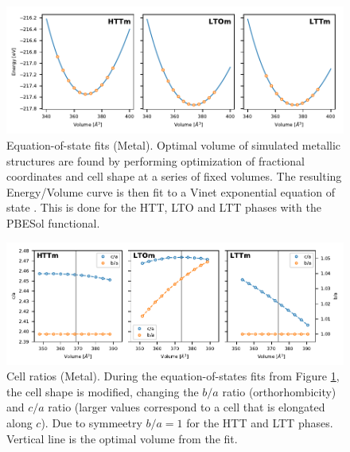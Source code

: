 \begin{figure}
    \centering
    \includegraphics[width=\textwidth]{fig/simulation/eos_metal_all.pdf}
    \caption[Metal: Equation-of-state fits]{Equation-of-state fits (Metal). Optimal volume of simulated metallic structures are found by performing optimization of fractional coordinates and cell shape at a series of fixed volumes. The resulting Energy/Volume curve is then fit to a Vinet exponential equation of state \cite{Vinet1987}. This is done for the HTT, LTO and LTT phases with the PBESol functional.}
    \label{fig:eos_metal_all}
\end{figure}

\begin{figure}
    \centering
    \includegraphics[width=\textwidth]{fig/simulation/ratio_metal_all.pdf}
    \caption[Metal: Cell ratios during EOS fits]{Cell ratios (Metal). During the equation-of-states fits from Figure \ref{fig:eos_metal_all}, the cell shape is modified, changing the $b/a$ ratio (orthorhombicity) and $c/a$ ratio (larger values correspond to a cell that is elongated along $c$). Due to symmeetry $b/a = 1$ for the HTT and LTT phases. Vertical line is the optimal volume from the fit.}
    \label{fig:eos_ratios}
\end{figure}

